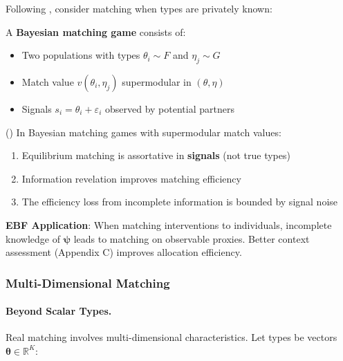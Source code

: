 Following \citet{johnson2019matching}, consider matching when types are privately known:

\begin{definition}
\label{def:bayesian-matching}
A \textbf{Bayesian matching game} consists of:
\begin{itemize}
    \item Two populations with types $\theta_i \sim F$ and $\eta_j \sim G$
    \item Match value $v(\theta_i, \eta_j)$ supermodular in $(\theta, \eta)$
    \item Signals $s_i = \theta_i + \varepsilon_i$ observed by potential partners
\end{itemize}
\end{definition}

\begin{theorem}
\label{thm:uncertain-matching}
\textup{(\citet{johnson2019matching})}
In Bayesian matching games with supermodular match values:
\begin{enumerate}
    \item Equilibrium matching is assortative in \textbf{signals} (not true types)
    \item Information revelation improves matching efficiency
    \item The efficiency loss from incomplete information is bounded by signal noise
\end{enumerate}
\end{theorem}

\textbf{EBF Application}: When matching interventions to individuals, incomplete 
knowledge of $\boldsymbol{\psi}$ leads to matching on observable proxies. Better 
context assessment (Appendix C) improves allocation efficiency.

\subsubsection{Multi-Dimensional Matching}

\paragraph{Beyond Scalar Types.}

Real matching involves multi-dimensional characteristics. Let types be vectors 
$\boldsymbol{\theta} \in \mathbb{R}^K$:


